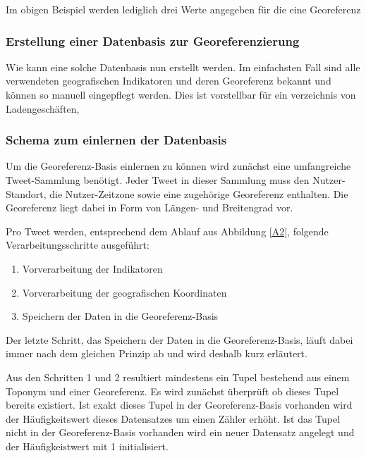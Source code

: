 			Im obigen Beispiel werden lediglich drei Werte angegeben für die eine Georeferenz 

			\subsubsection{Erstellung einer Datenbasis zur Georeferenzierung}

				Wie kann eine solche Datenbasis nun erstellt werden.
				Im einfachsten Fall sind alle verwendeten geografischen Indikatoren und deren Georeferenz bekannt und können so manuell eingepflegt werden.
				Dies ist vorstellbar für ein verzeichnis von Ladengeschäften,   

			\subsubsection{Schema zum einlernen der Datenbasis}



				Um die Georeferenz-Basis einlernen zu können wird zunächst eine umfangreiche Tweet-Sammlung benötigt.
				Jeder Tweet in dieser Sammlung muss den Nutzer-Standort, die Nutzer-Zeitzone sowie eine zugehörige Georeferenz enthalten.
				Die Georeferenz liegt dabei in Form von Längen- und Breitengrad vor. 
				
				Pro Tweet werden, entsprechend dem Ablauf aus Abbildung \ref{A2}, folgende Verarbeitungsschritte ausgeführt:

				\begin{enumerate}
					\item Vorverarbeitung der Indikatoren
					\item Vorverarbeitung der geografischen Koordinaten
					\item Speichern der Daten in die Georeferenz-Basis
				\end{enumerate}

				Der letzte Schritt, das Speichern der Daten in die Georeferenz-Basis, läuft dabei immer nach dem gleichen Prinzip ab und wird deshalb kurz erläutert.
				
				Aus den Schritten 1 und 2 resultiert mindestens ein Tupel bestehend aus einem Toponym und einer Georeferenz. 
				Es wird zunächst überprüft ob dieses Tupel bereits existiert.
				Ist exakt dieses Tupel in der Georeferenz-Basis vorhanden wird der Häufigkeitswert dieses Datensatzes um einen Zähler erhöht.
				Ist das Tupel nicht in der Georeferenz-Basis vorhanden wird ein neuer Datensatz angelegt und der Häufigkeistwert mit 1 initialisiert.

